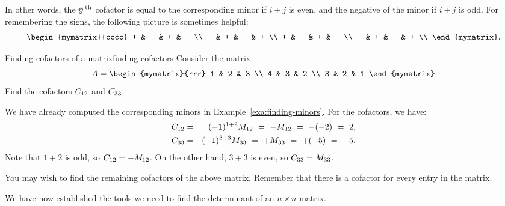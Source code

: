 In other words, the $\ijth$ cofactor is equal to the corresponding
minor if $i+j$ is even, and the negative of the minor if $i+j$ is
odd. For remembering the signs, the following picture is sometimes
helpful:
\begin{equation*}
  \begin{mymatrix}{cccc}
    + & - & + & - \\
    - & + & - & + \\
    + & - & + & - \\
    - & + & - & + \\
  \end{mymatrix}.
\end{equation*}

\begin{example}{Finding cofactors of a matrix}{finding-cofactors}
  Consider the matrix
  \begin{equation*}
    A=\begin{mymatrix}{rrr}
      1 & 2 & 3 \\
      4 & 3 & 2 \\
      3 & 2 & 1
    \end{mymatrix}
  \end{equation*}
  Find the cofactors $\cof{A}{12}$ and $\cof{A}{33}$.
\end{example}

\begin{solution}
  We have already computed the corresponding minors in
  Example~\ref{exa:finding-minors}. For the cofactors, we have:
  \begin{eqnarray*}
    \cof{A}{12} &=& (-1)^{1+2}\minor{A}{12} ~=~ -\minor{A}{12} ~=~ -(-2) ~=~ 2,\\
    \cof{A}{33} &=& (-1)^{3+3}\minor{A}{33} ~=~ +\minor{A}{33} ~=~ +(-5) ~=~ -5.\\
  \end{eqnarray*}
  Note that $1+2$ is odd, so $\cof{A}{12}=-\minor{A}{12}$. On the
  other hand, $3+3$ is even, so $\cof{A}{33}=\minor{A}{33}$.
\end{solution}

You may wish to find the remaining cofactors of the above
matrix. Remember that there is a cofactor for every entry in the
matrix.

We have now established the tools we need to find the determinant of
an $n\times n$-matrix.

